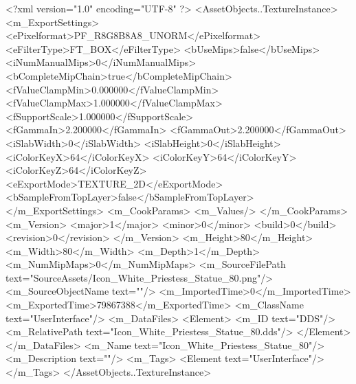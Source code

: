 <?xml version="1.0" encoding="UTF-8" ?>
<AssetObjects..TextureInstance>
	<m_ExportSettings>
		<ePixelformat>PF_R8G8B8A8_UNORM</ePixelformat>
		<eFilterType>FT_BOX</eFilterType>
		<bUseMips>false</bUseMips>
		<iNumManualMips>0</iNumManualMips>
		<bCompleteMipChain>true</bCompleteMipChain>
		<fValueClampMin>0.000000</fValueClampMin>
		<fValueClampMax>1.000000</fValueClampMax>
		<fSupportScale>1.000000</fSupportScale>
		<fGammaIn>2.200000</fGammaIn>
		<fGammaOut>2.200000</fGammaOut>
		<iSlabWidth>0</iSlabWidth>
		<iSlabHeight>0</iSlabHeight>
		<iColorKeyX>64</iColorKeyX>
		<iColorKeyY>64</iColorKeyY>
		<iColorKeyZ>64</iColorKeyZ>
		<eExportMode>TEXTURE_2D</eExportMode>
		<bSampleFromTopLayer>false</bSampleFromTopLayer>
	</m_ExportSettings>
	<m_CookParams>
		<m_Values/>
	</m_CookParams>
	<m_Version>
		<major>1</major>
		<minor>0</minor>
		<build>0</build>
		<revision>0</revision>
	</m_Version>
	<m_Height>80</m_Height>
	<m_Width>80</m_Width>
	<m_Depth>1</m_Depth>
	<m_NumMipMaps>0</m_NumMipMaps>
	<m_SourceFilePath text="SourceAssets/Icon_White_Priestess_Statue_80.png"/>
	<m_SourceObjectName text=""/>
	<m_ImportedTime>0</m_ImportedTime>
	<m_ExportedTime>79867388</m_ExportedTime>
	<m_ClassName text="UserInterface"/>
	<m_DataFiles>
		<Element>
			<m_ID text="DDS"/>
			<m_RelativePath text="Icon_White_Priestess_Statue_80.dds"/>
		</Element>
	</m_DataFiles>
	<m_Name text="Icon_White_Priestess_Statue_80"/>
	<m_Description text=""/>
	<m_Tags>
		<Element text="UserInterface"/>
	</m_Tags>
</AssetObjects..TextureInstance>
